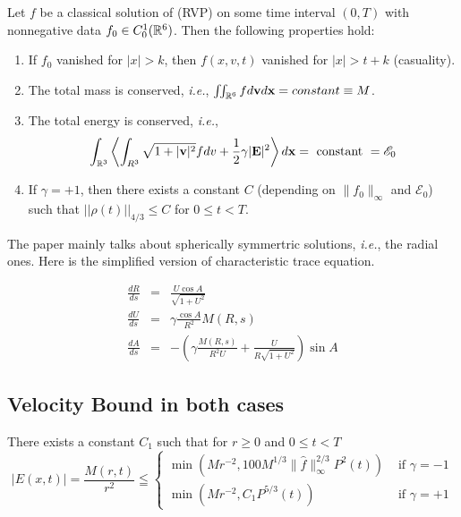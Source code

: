 \begin{proposition}
    Let $f$ be a classical solution of (RVP) on some time interval $(0,T)$ with nonnegative data $f_0\in C_0^1({\mathbb{R}}^6)$. Then the following properties hold:
    \begin{enumerate}
        \item If $f_0$ vanished for $|x|>k$, then $f(x,v,t)$ vanished for $|x|>t+k$ (casuality).
        \item The total mass is conserved, \textit{i.e.}, $\iint_{{\mathbb{R}}^6}fd\mathbf{v} d\mathbf{x} = constant \equiv M$.
        \item The total energy is conserved, \textit{i.e.},
        $$
\int_{\mathbb{R}^{3}}\left\langle\int_{R^{3}} \sqrt{1+|\mathbf{v}|^{2}} f d v+\frac{1}{2} \gamma|\mathbf{E}|^{2}\right\rangle d \mathbf{x}=\text { constant }=\mathscr{E}_{0}
$$
        \item If $\gamma=+1$, then there exists a constant $C$ (depending on $\|f_0\|_{\infty}$ and $\mathscr{E}_0$) such that $||\rho(t)||_{4/3}\leq C$ for $0 \leq t < T$.
    \end{enumerate}
\end{proposition}


The paper mainly talks about spherically symmertric solutions, \textit{i.e.}, the radial ones. Here is the simplified version of characteristic trace equation.

\begin{eqnarray}
    \frac{d R}{d s}&=&\frac{U \cos A}{\sqrt{1+U^{2}}} \\
    \frac{d U}{d s}&=&\gamma \frac{\cos A}{R^{2}} M(R, s) \\
    \frac{d A}{d s}&=&-\left(\gamma \frac{M(R, s)}{R^{2} U}+\frac{U}{R \sqrt{1+U^{2}}}\right) \sin A
\end{eqnarray}




\subsection{Velocity Bound in both cases}
\begin{lemma}
There exists a constant $C_{1}$ such that for $r \geq 0$ and $0 \leq t<T$
$$
|E(x, t)|=\frac{M(r, t)}{r^{2}} \leqq\left\{\begin{array}{ll}
{\min \left(M r^{-2}, 100 M^{1 / 3}\|\hat{f}\|_{\infty}^{2 / 3} P^{2}(t)\right)} & {\text { if } \gamma=-1} \\
{\min \left(M r^{-2}, C_{1} P^{5 / 3}(t)\right)} & {\text { if } \gamma=+1}
\end{array}\right.
$$
\end{lemma}

